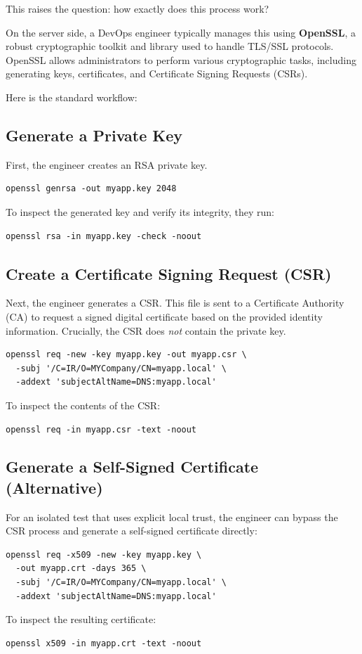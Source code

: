 \documentclass[journal]{IEEEtran}
\begin{document}
This raises the question: how exactly does this process work?

On the server side, a DevOps engineer typically manages this using \textbf{OpenSSL}, a robust cryptographic toolkit and library used to handle TLS/SSL protocols. OpenSSL allows administrators to perform various cryptographic tasks, including generating keys, certificates, and Certificate Signing Requests (CSRs).

Here is the standard workflow:

\subsection{Generate a Private Key}
First, the engineer creates an RSA private key.
\begin{lstlisting}
openssl genrsa -out myapp.key 2048
\end{lstlisting}
To inspect the generated key and verify its integrity, they run:
\begin{lstlisting}
openssl rsa -in myapp.key -check -noout
\end{lstlisting}

\subsection{Create a Certificate Signing Request (CSR)}
Next, the engineer generates a CSR. This file is sent to a Certificate Authority (CA) to request a signed digital certificate based on the provided identity information. Crucially, the CSR does \textit{not} contain the private key.
\begin{lstlisting}
openssl req -new -key myapp.key -out myapp.csr \
  -subj '/C=IR/O=MYCompany/CN=myapp.local' \
  -addext 'subjectAltName=DNS:myapp.local'
\end{lstlisting}
To inspect the contents of the CSR:
\begin{lstlisting}
openssl req -in myapp.csr -text -noout
\end{lstlisting}

\subsection{Generate a Self-Signed Certificate (Alternative)}
For an isolated test that uses explicit local trust, the engineer can bypass the CSR process and generate a self-signed certificate directly:
\begin{lstlisting}
openssl req -x509 -new -key myapp.key \
  -out myapp.crt -days 365 \
  -subj '/C=IR/O=MYCompany/CN=myapp.local' \
  -addext 'subjectAltName=DNS:myapp.local'
\end{lstlisting}
To inspect the resulting certificate:
\begin{lstlisting}
openssl x509 -in myapp.crt -text -noout
\end{lstlisting}
\end{document}
